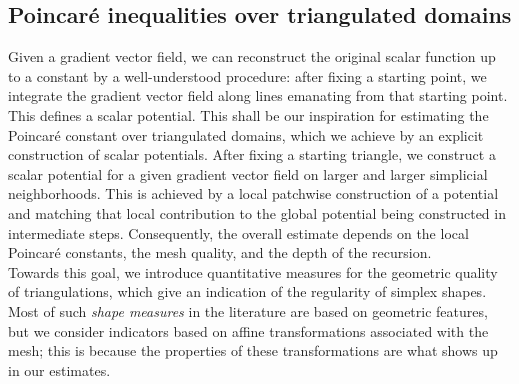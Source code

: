 \documentclass[a4paper]{article}
\begin{document}







\subsection{Poincar\'e inequalities over triangulated domains}

Given a gradient vector field, we can reconstruct the original scalar function up to a constant by a well-understood procedure: after fixing a starting point, we integrate the gradient vector field along lines emanating from that starting point. This defines a scalar potential. 
This shall be our inspiration for estimating the Poincar\'e constant over triangulated domains, which we achieve by an explicit construction of scalar potentials. 
After fixing a starting triangle, we construct a scalar potential for a given gradient vector field on larger and larger simplicial neighborhoods. This is achieved by a local patchwise construction of a potential and matching that local contribution to the global potential being constructed in intermediate steps. 
Consequently, the overall estimate depends on the local Poincar\'e constants, the mesh quality, and the depth of the recursion. 
\\

Towards this goal, we introduce quantitative measures for the geometric quality of triangulations,
which give an indication of the regularity of simplex shapes. 
Most of such \emph{shape measures} in the literature are based on geometric features, 
but we consider indicators based on affine transformations associated with the mesh;
this is because the properties of these transformations are what shows up in our estimates. 
\end{document}
